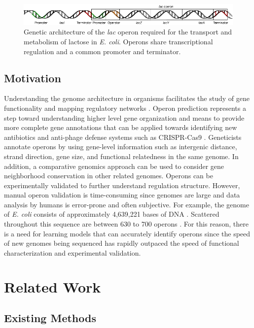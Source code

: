 \documentclass{article}
\begin{document}
\begin{figure}
  \centering
  \includegraphics[width=1\textwidth]{images/lac_operon_wiki.png}
  \caption{Genetic architecture of the \textit{lac} operon required for the transport and metabolism of lactose in \textit{E. coli}. Operons share transcriptional regulation and a common promoter and terminator.}
  \label{fig:lac_operon}
\end{figure}

\subsection{Motivation}

Understanding the genome architecture in organisms facilitates the study of gene functionality and mapping regulatory networks \cite{assaf_detecting_2021}. Operon prediction represents a step toward understanding higher level gene organization and means to provide more complete gene annotations that can be applied towards identifying new antibiotics \cite{pantosti_mechanisms_2007} and anti-phage defense systems such as CRISPR-Cas9 \cite{medina-aparicio_crisprcas_2011}. Geneticists annotate operons by using gene-level information such as intergenic distance, strand direction, gene size, and functional relatedness in the same genome. In addition, a comparative genomics approach can be used to consider gene neighborhood conservation in other related genomes. Operons can be experimentally validated to further understand regulation structure. However, manual operon validation is time-consuming since genomes are large and data analysis by humans is error-prone and often subjective. For example, the genome of \textit{E. coli} consists of approximately 4,639,221 bases of DNA \cite{blattner_complete_1997}. Scattered throughout this sequence are between 630 to 700 operons \cite{salgado_operons_2000}. For this reason, there is a need for learning models that can accurately identify operons since the speed of new genomes being sequenced has rapidly outpaced the speed of functional characterization and experimental validation.

\section{Related Work}

\subsection{Existing Methods}
\end{document}

